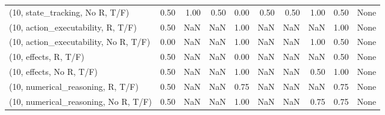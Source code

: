\begin{table*}[h!]
\begin{adjustbox}{width=2\columnwidth,center}
\begin{tabular}{lrrr|rrr|rrr}
(10, state\_tracking, No R, T/F)       &                      0.50 &                  1.00 &                      0.50 &                          0.00 &                      0.50 &                          0.50 &                                   1.00 &                               0.50 &                                  None \\
(10, action\_executability, R, T/F)    &                      0.50 &                   NaN &                       NaN &                          1.00 &                       NaN &                           NaN &                                    NaN &                               1.00 &                                  None \\
(10, action\_executability, No R, T/F) &                      0.00 &                   NaN &                       NaN &                          1.00 &                       NaN &                           NaN &                                   1.00 &                               0.50 &                                  None \\
(10, effects, R, T/F)                 &                      0.50 &                   NaN &                       NaN &                          0.00 &                       NaN &                           NaN &                                    NaN &                               0.50 &                                  None \\
(10, effects, No R, T/F)              &                      0.50 &                   NaN &                       NaN &                          1.00 &                       NaN &                           NaN &                                   0.50 &                               1.00 &                                  None \\
(10, numerical\_reasoning, R, T/F)     &                      0.50 &                   NaN &                       NaN &                          0.75 &                       NaN &                           NaN &                                    NaN &                               0.75 &                                  None \\
(10, numerical\_reasoning, No R, T/F)  &                      0.50 &                   NaN &                       NaN &                          1.00 &                       NaN &                           NaN &                                   0.75 &                               0.75 &                                  None \\

\end{tabular}
\end{adjustbox}
\end{table*}
